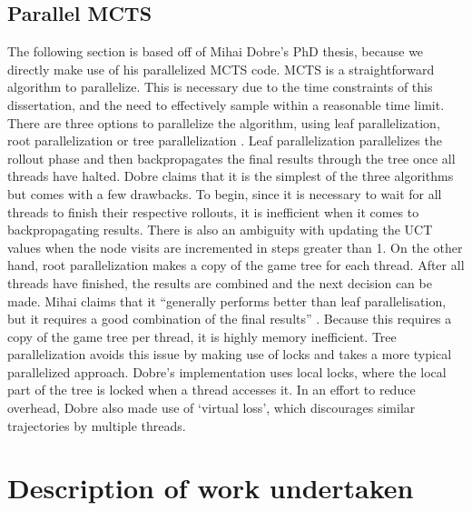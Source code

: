 \documentclass[msc, ai, twoside, notimes, logo, parskip, leftchapter, normalheadings]{infthesis}
\begin{document}
\section{Parallel MCTS}
The following section is based off of Mihai Dobre's PhD thesis, because we directly make use of his parallelized MCTS code. MCTS is a straightforward algorithm to parallelize. This is necessary due to the time constraints of this dissertation, and the need to effectively sample within a reasonable time limit. There are three options to parallelize the algorithm, using leaf parallelization, root parallelization or tree parallelization \citep{Mihai}. Leaf parallelization parallelizes the rollout phase and then backpropagates the final results through the tree once all threads have halted. Dobre claims that it is the simplest of the three algorithms but comes with a few drawbacks. To begin, since it is necessary to wait for all threads to finish their respective rollouts, it is inefficient when it comes to backpropagating results. There is also an ambiguity with updating the UCT values when the node visits are incremented in steps greater than 1. On the other hand, root parallelization makes a copy of the game tree for each thread. After all threads have finished, the results are combined and the next decision can be made. Mihai claims that it ``generally performs better than leaf parallelisation, but it requires a good combination of the final results'' \citep{Mihai}. Because this requires a copy of the game tree per thread, it is highly memory inefficient. Tree parallelization avoids this issue by making use of locks and takes a more typical parallelized approach. Dobre's implementation uses local locks, where the local part of the tree is locked when a thread accesses it. In an effort to reduce overhead, Dobre also made use of `virtual loss', which discourages similar trajectories by multiple threads.

\chapter{Description of work undertaken}
\end{document}
